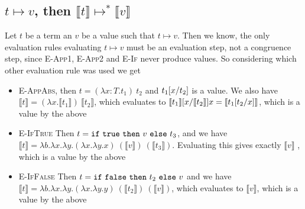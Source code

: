 \documentclass{article}
\newcommand{\subst}[3]{\ensuremath #1[#2/#3]}
\newcommand{\cond}[3]{\ensuremath \mathtt{if}\ #1\ \mathtt{then}\ #2\ \mathtt{else}\ #3}
\begin{document}
\subsection*{$t \mapsto v$, then $\llbracket t\rrbracket\mapsto^* \llbracket v\rrbracket$}
Let $t$ be a term an $v$ be a value such that $t \mapsto v$. 
Then we know, the only evaluation rules evaluating $t\mapsto v$ must be an evaluation step, not a congruence step, since \textsc{E-App1}, \textsc{E-App2} and \textsc{E-If} never produce values.
So considering which other evaluation rule was used we get 
\begin{itemize}
\item \textsc{E-AppAbs}, then $t = (\lambda x:T.t_1)\ t_2$ and $\subst{t_1}{x}{t_2}$ is a value. 
We also have $\llbracket t \rrbracket = (\lambda x.\llbracket t_1 \rrbracket)\ \llbracket t_2 \rrbracket$, 
which evaluates to $\subst{\llbracket t_1 \rrbracket }{x}{\llbracket t_2 \rrbracket}{x} = \llbracket \subst{t_1}{t_2}{x} \rrbracket$, which is a value by the above
\item \textsc{E-IfTrue}
Then $t = \cond{\mathtt{true}}{v}{t_3}$, and we have $\llbracket t \rrbracket = \lambda b.\lambda x.\lambda y. (\lambda x.\lambda y.x)\ (\llbracket v \rrbracket)\ (\llbracket t_3 \rrbracket)$. 
Evaluating this gives exactly $\llbracket v \rrbracket$ , which is a value by the above
\item \textsc{E-IfFalse}
Then $t = \cond{\mathtt{false}}{t_2}{v}$ and we have $\llbracket t \rrbracket = \lambda b.\lambda x.\lambda y. (\lambda x.\lambda y.y)\ (\llbracket t_2 \rrbracket)\ (\llbracket v \rrbracket)$, which evaluates to $\llbracket v \rrbracket$, which is a value by the above
\end{itemize}
\end{document}
